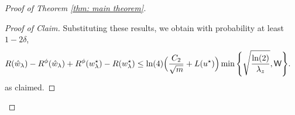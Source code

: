 \begin{proof}[Proof of Theorem \ref{thm: main theorem}]
\begin{proof}[Proof of Claim]
Substituting these results, we obtain with probability at least $1-2\delta$,
        \begin{equation*}
            \begin{aligned}
                & R(\hat{w}_\lambda) - R^\phi(\hat{w}_\lambda) + R^\phi(w^\star_{\lambda}) - R(w^\star_{\lambda}) \leq \ln(4)\Big(\frac{C_2}{\sqrt{m}} + L(u^\star)\Big) \min\Bigg\{\sqrt{\frac{\ln(2)}{\lambda_z}}, \mathsf{W}\Bigg\}.
            \end{aligned}
        \end{equation*}
        as claimed.
    \end{proof}


\end{proof}
